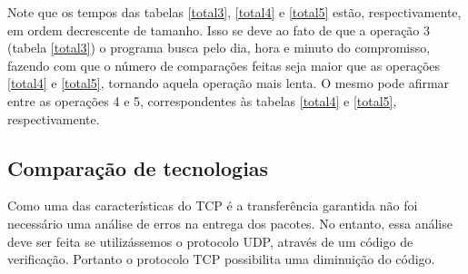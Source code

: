 \documentclass[10pt,a4paper]{article}
\begin{document}
  \begin{table}[h!]
    \begin{center}

      \hspace{30mm}

    \end{center}
    \vspace{-5mm}
    \caption{Conexão, login na conta, ver todos os compromissos do mês
      e fechamento de conexão com servidor} \label{op5}
  \end{table}

  
  Note que os tempos das tabelas \ref{total3}, \ref{total4} e
  \ref{total5} estão, respectivamente, em ordem decrescente de
  tamanho. Isso se deve ao fato de que a operação 3 (tabela
  \ref{total3}) o programa busca pelo dia, hora e minuto do
  compromisso, fazendo com que o número de comparações feitas seja
  maior que as operações \ref{total4} e \ref{total5}, tornando aquela
  operação mais lenta. O mesmo pode afirmar entre as operações 4 e 5,
  correspondentes às tabelas \ref{total4} e \ref{total5}, respectivamente.

\subsection{Comparação de tecnologias}
Como uma das características do TCP é a transferência garantida não foi
necessário uma análise de erros na entrega dos pacotes. No entanto, essa análise
deve ser feita se utilizássemos o protocolo UDP, através de um código
de verificação. Portanto o protocolo TCP possibilita uma diminuição do código.
\end{document}
